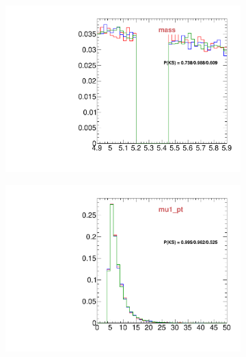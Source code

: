 \begin{figure}
\begin{subfigure}[b]{0.2\textwidth}
                \includegraphics[width=\textwidth]{Figures/VariablesComparison/Data_endcaps_figs_3h/mass}
                \label{fig:Data_endcaps_mass_3h}
        \end{subfigure}
        \begin{subfigure}[b]{0.2\textwidth}
                \centering
                \includegraphics[width=\textwidth]{Figures/VariablesComparison/Data_endcaps_figs_3h/mu1_pt}
                \label{fig:Data_endcaps_mu1_pt_3h}
        \end{subfigure}
        \begin{subfigure}[b]{0.2\textwidth}
                \centering

\end{subfigure}
\end{figure}
